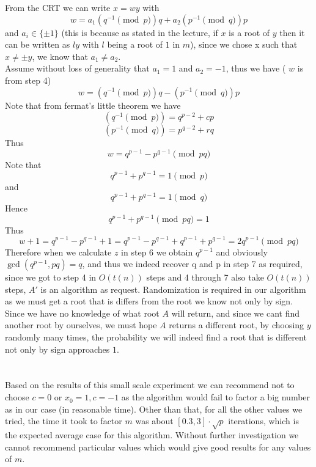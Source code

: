 \documentclass{article}
\begin{document}
From the CRT we can write $x = wy$ with 
\[w = a_1(q^{-1} \pmod p)q + a_2(p^{-1} \pmod q)p\]
and $a_i \in \{\pm 1\}$ (this is because as stated in the lecture, if $x$ is a root of $y$ then it can be written as $ly$ with $l$ being a root of $1$ in $m$), since we chose x such that $x \neq \pm y$, we know that $a_1 \neq a_2$.\\
Assume without loss of generality that $a_1 = 1$ and  $a_2 = -1$, thus we have ( $w$ is from step 4)
\[w = (q^{-1} \pmod p)q - (p^{-1} \pmod q)p \]
Note that from fermat's little theorem we have 
\[(q^{-1} \pmod p)= q^{p-2} + cp\]
\[(p^{-1} \pmod q)= p^{q-2} + rq\]
Thus 
\[w = q^{p-1} - p^{q-1} \pmod {pq}\]
Note that 
\[q^{p-1} + p^{q-1} = 1 \pmod p\]
and
\[q^{p-1} + p^{q-1}  = 1 \pmod q\]
Hence
\[q^{p-1} + p^{q-1} \pmod {pq} = 1\]
Thus
\[w + 1 = q^{p-1} - p^{q-1} + 1  = q^{p-1} - p^{q-1} + q^{p-1} + p^{q-1} = 2q^{p-1} \pmod {pq}\]
Therefore when we calculate $z$ in step 6 we obtain $q^{p-1}$ and obviously $\gcd(q^{p-1}, pq) = q$, and thus we indeed recover q and p in step 7 as required, since we got to step 4 in $O(t(n))$ steps and 4 through 7 also take $O(t(n))$ steps, $A'$ is an algorithm as request.
Randomization is required in our algorithm as we must get a root that is differs from the root we know not only by sign. Since we have no knowledge of what root $A$ will return, and since we cant find another root by ourselves, we must hope $A$ returns a different root, by choosing $y$ randomly many times, the probability we will indeed find a root that is different not only by sign approaches $1$.
 

\section{} %



\subsection{} %
Based on the results of this small scale experiment we can recommend not to choose $c=0$ or $x_0=1,c=-1$ as the algorithm would fail to factor a big number as in our case (in reasonable time).
Other than that, for all the other values we tried, the time it took to factor $m$ was about $[0.3, 3] \cdot \sqrt{p}$ iterations, which is the expected average case for this algorithm. Without further investigation we cannot recommend particular values which would give good results for any values of $m$.
\end{document}
